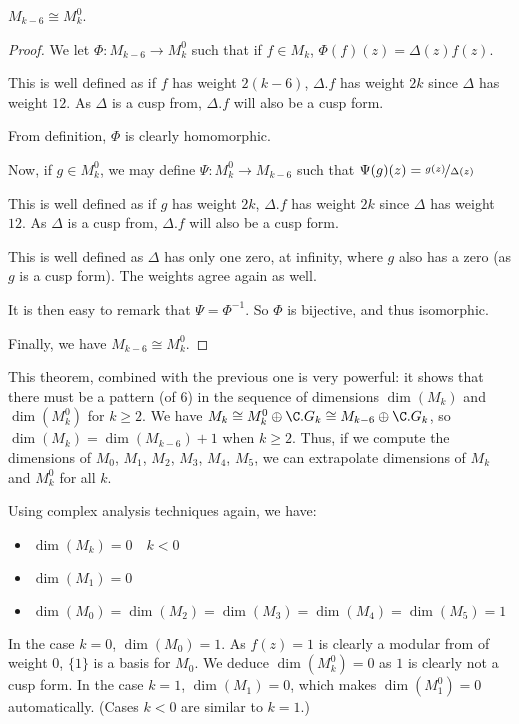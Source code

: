 \begin{theorem}
    $M_{k-6} \cong M_k^0$. \cite[p.88]{CourseInArithmetic}
\end{theorem}
\begin{proof}
    We let $\Phi:M_{k-6} \to M_k^0$ such that if $f \in M_k$, $\Phi(f)(z) = \Delta(z)f(z)$.
    
    This is well defined as if $f$ has weight $2(k-6)$, $\Delta.f$ has weight $2k$ since $\Delta$ has weight $12$. As $\Delta$ is a cusp from, $\Delta.f$ will also be a cusp form.
    
    From definition, $\Phi$ is clearly homomorphic.
    
    
    Now, if $g \in M_k^0$, we may define $\Psi: M_k^0 \to M_{k-6}$ such that $\Psi(g)(z) = \nicefrac{g(z)}{\Delta(z)}$
    
    This is well defined as if $g$ has weight $2k$, $\Delta.f$ has weight $2k$ since $\Delta$ has weight $12$. As $\Delta$ is a cusp from, $\Delta.f$ will also be a cusp form.
    
    This is well defined as $\Delta$ has only one zero, at infinity, where $g$ also has a zero (as $g$ is a cusp form). The weights agree again as well.
    
    It is then easy to remark that $\Psi = \Phi^{-1}$. So $\Phi$ is bijective, and thus isomorphic. 
    
    Finally, we have $M_{k-6} \cong M_k^0$.
\end{proof}
This theorem, combined with the previous one is very powerful: it shows that there must be a pattern (of 6) in the sequence of dimensions $\dim(M_k)$ and $\dim(M_k^0)$ for $k \geq 2$.
We have $M_k \cong M_k^0 \oplus \C.G_k \cong M_{k-6} \oplus \C.G_k$, so $\dim(M_k) = \dim(M_{k-6})+1$ when $k \geq 2$.
Thus, if we compute the dimensions of $M_0$, $M_1$, $M_2$, $M_3$, $M_4$, $M_5$, we can extrapolate dimensions of $M_k$ and $M_k^0$ for all $k$.

Using complex analysis techniques again, we have:
\begin{itemize}
    \item $\dim(M_k) = 0 \quad k < 0$
    \item $\dim(M_1) = 0$
    \item $\dim(M_0) = \dim(M_2) = \dim(M_3) = \dim(M_4) = \dim(M_5) = 1$
\end{itemize}
In the case $k=0$, $\dim(M_0) = 1$. As $f(z) = 1$ is clearly a modular from of weight $0$, $\{1\}$ is a basis for $M_0$. We deduce $\dim(M_k^0) = 0$ as $1$ is clearly not a cusp form.
In the case $k=1$, $\dim(M_1) = 0$, which makes $\dim(M_1^0) = 0$ automatically.
(Cases $k<0$ are similar to $k=1$.)

